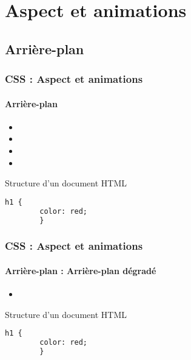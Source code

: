 \documentclass[xcolor=table]{beamer}
\begin{document}
\section{Aspect et animations}

\subsection{Arrière-plan}

\begin{frame}[fragile]
\frametitle{CSS : Aspect et animations}
\framesubtitle{Arrière-plan}

\begin{minipage}{0.60\textwidth}
	\begin{itemize}
		\item {}
		\item {}
		\item {}
		\item {}
	\end{itemize}
\end{minipage}
%
\begin{minipage}{0.38\textwidth}
	\begin{block}{Structure d'un document HTML}
		\lstset{escapeinside=**}
		\scriptsize\bfseries
		\begin{lstlisting}[language={html}]
		h1 {
		color: red;
		}
		\end{lstlisting}
	\end{block}
\end{minipage}
\end{frame}

\begin{frame}[fragile]
\frametitle{CSS : Aspect et animations}
\framesubtitle{Arrière-plan : Arrière-plan dégradé}

\begin{minipage}{0.60\textwidth}
	\begin{itemize}
		\item 
	\end{itemize}
\end{minipage}
%
\begin{minipage}{0.38\textwidth}
	\begin{block}{Structure d'un document HTML}
		\lstset{escapeinside=**}
		\scriptsize\bfseries
		\begin{lstlisting}[language={html}]
		h1 {
		color: red;
		}
		\end{lstlisting}
	\end{block}
\end{minipage}
\end{frame}
\end{document}
